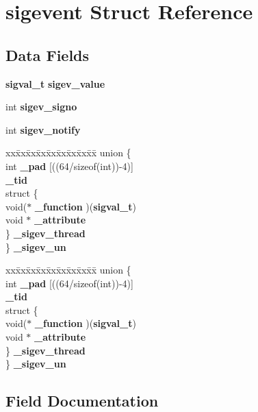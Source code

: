 \section{sigevent Struct Reference}
\label{structsigevent}
\subsection*{Data Fields}
\begin{DoxyCompactItemize}
\item 
{\bf sigval\_\-t} {\bf sigev\_\-value}
\item 
int {\bf sigev\_\-signo}
\item 
int {\bf sigev\_\-notify}
\item 
\begin{tabbing}
xx\=xx\=xx\=xx\=xx\=xx\=xx\=xx\=xx\=\kill
union \{\\
\>int {\bf \_pad} [((64/sizeof(int))-\/4)]\\
 {\bf \_tid}\\
\>struct \{\\
\>\>void($\ast$ {\bf \_function} )({\bf sigval\_t})\\
\>\>void $\ast$ {\bf \_attribute}\\
\>\} {\bf \_sigev\_thread}\\
\} {\bf \_sigev\_un}\\

\end{tabbing}\item 
\begin{tabbing}
xx\=xx\=xx\=xx\=xx\=xx\=xx\=xx\=xx\=\kill
union \{\\
\>int {\bf \_pad} [((64/sizeof(int))-\/4)]\\
 {\bf \_tid}\\
\>struct \{\\
\>\>void($\ast$ {\bf \_function} )({\bf sigval\_t})\\
\>\>void $\ast$ {\bf \_attribute}\\
\>\} {\bf \_sigev\_thread}\\
\} {\bf \_sigev\_un}\\

\end{tabbing}\end{DoxyCompactItemize}


\subsection{Field Documentation}
